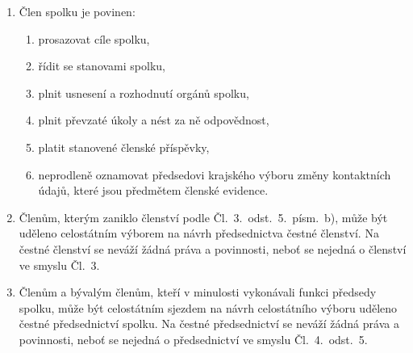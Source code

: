 \documentclass[a4paper]{article}
\begin{document}
\begin{enumerate}
    \item Člen spolku je povinen:
        \begin{enumerate}
        \item prosazovat cíle spolku,

        \item řídit se stanovami spolku,

        \item plnit usnesení a rozhodnutí orgánů spolku,

        \item plnit převzaté úkoly a nést za ně odpovědnost,

        \item platit stanovené členské příspěvky,

        \item neprodleně oznamovat předsedovi krajského výboru
        změny kontaktních údajů, které jsou předmětem členské evidence.
        \end{enumerate}

    \item Členům, kterým zaniklo členství podle Čl.~3.~odst.~5.~písm.~b), může být uděleno celostátním
        výborem na návrh předsednictva čestné členství. Na čestné členství se neváží žádná práva a
        povinnosti, neboť se nejedná o členství ve smyslu Čl.~3.

    \item Členům a bývalým členům, kteří v minulosti vykonávali funkci
        předsedy spolku, může být celostátním sjezdem na návrh celostátního výboru uděleno čestné
        předsednictví spolku. Na čestné předsednictví se neváží žádná práva a povinnosti, neboť se
        nejedná o předsednictví ve smyslu Čl.~4.~odst.~5.

    \end{enumerate}
\end{document}
